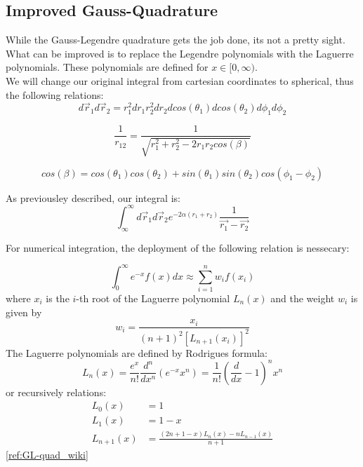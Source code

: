 \documentclass[../main.tex]{subfiles}
\begin{document}
\subsection{Improved Gauss-Quadrature} \label{sec:improved_GQ}


While the Gauss-Legendre quadrature gets the job done, its not a pretty sight. What can be improved is to replace the Legendre polynomials with the Laguerre polynomials. These polynomials are defined for $x \in [0, \infty)$.
\\
We will change our original integral from cartesian coordinates to spherical, thus the following relations:
\[ d\vec{r}_1 d\vec{r}_2 = r_1^2 dr_1 r_2^2 dr_2 dcos(\theta_1) dcos(\theta_2) d\phi_1 d\phi_2\]

\[\frac{1}{r_{12}} = \frac{1}{\sqrt{r_1^2 + r_2^2 - 2r_1r_2cos(\beta)}} \]

\[cos(\beta) = cos(\theta_1)cos(\theta_2) + sin(\theta_1)sin(\theta_2)cos(\phi_1 - \phi_2)\]

As previousley described, our integral is:
\[\int_{\infty}^\infty d\vec{r}_1 d\vec{r}_2 e^{-2\alpha(r_1 + r_2)} \frac{1}{\vec{r_1} - \vec{r_2}}\]

For numerical integration, the deployment of the following relation is nessecary:

\[\int_0^\infty e^{-x}f(x)dx \approx \sum_{i=1}^n w_i f(x_i)\]
where $x_i$ is the $i$-th root of the Laguerre polynomial $L_n(x)$ and the weight $w_i$ is given by
\[w_i = \frac{x_i}{(n+1)^2 [L_{n+1}(x_i)]^2}\]
The Laguerre polynomials are defined by Rodrigues formula:
\[L_n(x) = \frac{e^x}{n!}\frac{d^n}{dx^n}\left(e^{-x} x^n\right) = \frac{1}{n!}\left(\frac{d}{dx}-1\right)^n x^n\]
or recursively relations:
\begin{align*}
  L_0(x) &= 1\\
  L_1(x) &= 1 - x\\
  L_{n+1}(x) &= \frac{(2n + 1 - x)L_n(x) - nL_{n-1}(x)}{n+1}
\end{align*}
\ref{ref:GL-quad_wiki}
\end{document}
